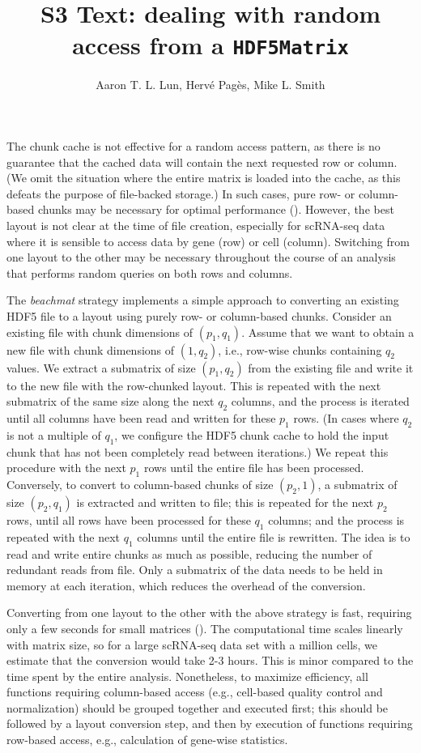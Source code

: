 \documentclass{article}
\title{S3 Text: dealing with random access from a \texttt{HDF5Matrix}}
\author{Aaron T. L. Lun, Herv\'e Pag\`es, Mike L. Smith}
\newcommand{\beachmat}{\textit{beachmat}}
\begin{document}
\maketitle

\noindent
The chunk cache is not effective for a random access pattern, as there is no guarantee that the cached data will contain the next requested row or column.
(We omit the situation where the entire matrix is loaded into the cache, as this defeats the purpose of file-backed storage.)
In such cases, pure row- or column-based chunks may be necessary for optimal performance (\suppfighdfrandomchunk{}).
However, the best layout is not clear at the time of file creation, especially for scRNA-seq data where it is sensible to access data by gene (row) or cell (column).
Switching from one layout to the other may be necessary throughout the course of an analysis that performs random queries on both rows and columns.

The \beachmat{} strategy implements a simple approach to converting an existing HDF5 file to a layout using purely row- or column-based chunks.
Consider an existing file with chunk dimensions of $(p_1, q_1)$. 
Assume that we want to obtain a new file with chunk dimensions of $(1, q_2)$, i.e., row-wise chunks containing $q_2$ values.
We extract a submatrix of size $(p_1, q_2)$ from the existing file and write it to the new file with the row-chunked layout.
This is repeated with the next submatrix of the same size along the next $q_2$ columns, and the process is iterated until all columns have been read and written for these $p_1$ rows.
(In cases where $q_2$ is not a multiple of $q_1$, we configure the HDF5 chunk cache to hold the input chunk that has not been completely read between iterations.)
We repeat this procedure with the next $p_1$ rows until the entire file has been processed.
Conversely, to convert to column-based chunks of size $(p_2, 1)$, a submatrix of size $(p_2, q_1)$ is extracted and written to file; this is repeated for the next $p_2$ rows, until all rows have been processed for these $q_1$ columns; and the process is repeated with the next $q_1$ columns until the entire file is rewritten.
The idea is to read and write entire chunks as much as possible, reducing the number of redundant reads from file.
Only a submatrix of the data needs to be held in memory at each iteration, which reduces the overhead of the conversion.

Converting from one layout to the other with the above strategy is fast, requiring only a few seconds for small matrices (\suppfighdfrandomrechunk{}).
The computational time scales linearly with matrix size, so for a large scRNA-seq data set with a million cells, we estimate that the conversion would take 2-3 hours.
This is minor compared to the time spent by the entire analysis.
Nonetheless, to maximize efficiency, all functions requiring column-based access (e.g., cell-based quality control and normalization) should be grouped together and executed first; 
this should be followed by a layout conversion step, and then by execution of functions requiring row-based access, e.g., calculation of gene-wise statistics.
\end{document}
